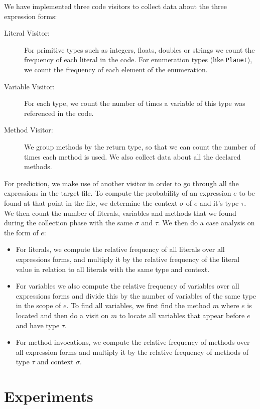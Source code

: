 \documentclass{article} %
\begin{document}
We have implemented three code visitors to collect data about the three expression forms:

\begin{description}
   \item[Literal Visitor:] For primitive types such as integers, floats, doubles or strings we count the frequency of each literal in the code. For enumeration types (like \texttt{Planet}), we count the frequency of each element of the enumeration.

   \item[Variable Visitor:] For each type, we count the number of times a variable of this type was referenced in the code.

   \item[Method Visitor:] We group methods by the return type, so that we can count the number of times each method is used. We also collect data about all the declared methods.
\end{description}

For prediction, we make use of another visitor in order to go through all the expressions in the target file. To compute the probability of an expression $e$ to be found at that point in the file, we determine the context $\sigma$ of $e$ and it's type $\tau$. We
then count the number of literals, variables and methods that we found during the collection phase with the same $\sigma$ and $\tau$. We then do a case analysis on the form of $e$:

\begin{itemize}
   \item For literals, we compute the relative frequency of all literals over all expressions forms, and multiply it by the relative frequency of the literal value in relation to all literals with the same type and context.
   \item For variables we also compute the relative frequency of variables over all expressions forms and divide this by the number of variables of the same type in the scope of $e$. To find all variables, we first find the method $m$ where $e$ is located and then do a visit on $m$ to locate all variables that appear before $e$ and have type $\tau$.
   \item For method invocations, we compute the relative frequency of methods over all expression forms and multiply it by the relative frequency of methods of type $\tau$ and context $\sigma$. 
\end{itemize}

\section*{Experiments}
\end{document}
